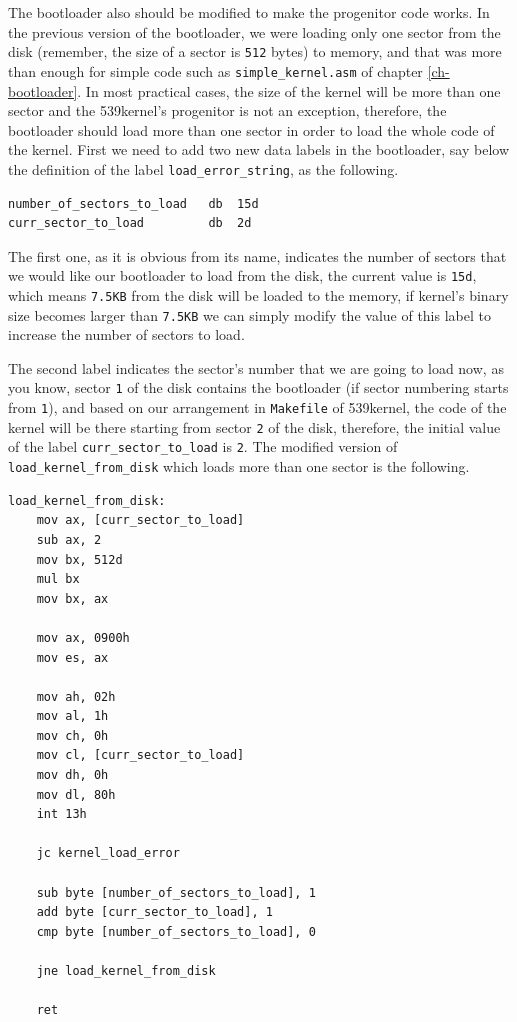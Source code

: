 The bootloader also should be modified to make the progenitor code
works. In the previous version of the bootloader, we were loading only
one sector from the disk (remember, the size of a sector is
\lstinline!512! bytes) to memory, and that was more than enough for
simple code such as \lstinline!simple_kernel.asm! of chapter
\ref{ch-bootloader}. In most practical cases, the size of the kernel
will be more than one sector and the 539kernel's progenitor is not an
exception, therefore, the bootloader should load more than one sector in
order to load the whole code of the kernel. First we need to add two new
data labels in the bootloader, say below the definition of the label
\lstinline!load_error_string!, as the following.

\begin{lstlisting}
number_of_sectors_to_load   db  15d
curr_sector_to_load         db  2d
\end{lstlisting}

The first one, as it is obvious from its name, indicates the number of
sectors that we would like our bootloader to load from the disk, the
current value is \lstinline!15d!, which means \lstinline!7.5KB! from the
disk will be loaded to the memory, if kernel's binary size becomes
larger than \lstinline!7.5KB! we can simply modify the value of this
label to increase the number of sectors to load.

The second label indicates the sector's number that we are going to load
now, as you know, sector \lstinline!1! of the disk contains the
bootloader (if sector numbering starts from \lstinline!1!), and based on
our arrangement in \lstinline!Makefile! of 539kernel, the code of the
kernel will be there starting from sector \lstinline!2! of the disk,
therefore, the initial value of the label
\lstinline!curr_sector_to_load! is \lstinline!2!. The modified version
of \lstinline!load_kernel_from_disk! which loads more than one sector is
the following.

\begin{lstlisting}
load_kernel_from_disk:
    mov ax, [curr_sector_to_load]
    sub ax, 2
    mov bx, 512d
    mul bx
    mov bx, ax
    
    mov ax, 0900h
    mov es, ax
    
    mov ah, 02h
    mov al, 1h
    mov ch, 0h
    mov cl, [curr_sector_to_load]
    mov dh, 0h
    mov dl, 80h
    int 13h
        
    jc kernel_load_error
    
    sub byte [number_of_sectors_to_load], 1
    add byte [curr_sector_to_load], 1
    cmp byte [number_of_sectors_to_load], 0
    
    jne load_kernel_from_disk
    
    ret
\end{lstlisting}

